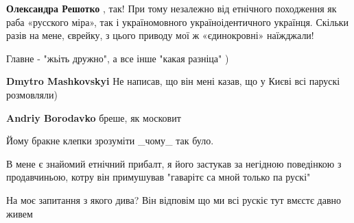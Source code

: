 \begin{itemize}
\begin{itemize}
\textbf{Олександра Решотко} , так! При тому незалежно від етнічного походження як раба «русского міра», так і україномовного україноідентичного українця. Скільки разів на мене, єврейку, з цього приводу мої ж «єдинокровні» наїжджали!
\end{itemize}

 
Главне - "жьіть дружно", а все інше "какая разніца" )

\begin{itemize}
 
\textbf{Dmytro Mashkovskyi}
Не написав, що він мені казав, що у Києві всі парускі розмовляли)

 
\textbf{Andriy Borodavko} бреше, як московит

 
Йому бракне клепки зрозуміти \_чому\_ так було.
\end{itemize}

 

В мене є знайомий етнічний прибалт, я його застукав за негідною поведінкою з
продавчиньою, котру він примушував "гаварітє са мной только па рускі"

На моє запитання з якого дива? Він відповім що ми всі рускіє тут вмєстє давно
живем


\end{itemize}
